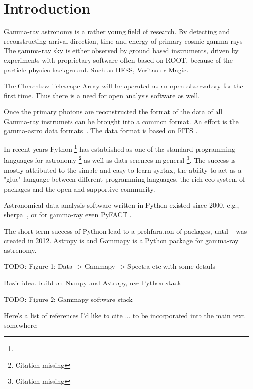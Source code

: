 \section{Introduction}
\label{sec:introduction}


Gamma-ray astronomy is a rather young field of research. By detecting and
reconstructing arrival direction, time and energy of primary cosmic gamma-rays
The gamma-ray sky is either observed by ground based instruments, driven by
experiments with proprietary software often based on ROOT, because of the
particle physics background. Such as HESS, Veritas or Magic.

The Cherenkov Telescope Array will be operated as an open observatory for the
first time. Thus there is a need for open analysis software as well.

Once the primary photons are reconstructed the format of the data of all
Gamma-ray instrumets can be brought into a common format. An effort is the
gamma-astro data formats~\cite{gadf-zenodo}. The data format is based on FITS
\citep{fits}.

In recent years Python \footnote{\PythonUrl} has established as one of the
standard programming  languages for astronomy \footnote{Citation missing} as
well as data sciences in  general \footnote{Citation missing}. The success is
mostly attributed to the simple and easy to learn syntax, the ability to act as
a "glue" language between different programming languages, the rich eco-system
of packages and the open and supportive community.

Astronomical data analysis software written in Python existed since 2000. e.g.,
sherpa~\citep{sherpa-2011, sherpa-2009}, or for gamma-ray even PyFACT
\citep{pyfact}.

The short-term success of Pythion lead to a prolifaration of packages, until
\astropy~\citep{astropy} was created in 2012. Astropy is and Gammapy is a
Python package for gamma-ray astronomy.



TODO: Figure 1: Data -> Gammapy -> Spectra etc with some details

Basic idea: build on Numpy and Astropy, use Python stack

TODO: Figure 2: Gammapy software stack

Here's a list of references I'd like to cite ... to be incorporated into the
main text somewhere:

